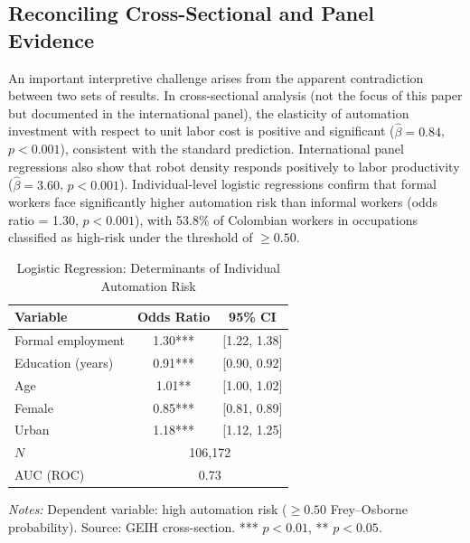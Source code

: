 \documentclass[5p,times,authoryear]{elsarticle}
\begin{document}
\subsection{Reconciling Cross-Sectional and Panel Evidence}
\label{subsec:reconciling}

An important interpretive challenge arises from the apparent contradiction between two sets of results. In cross-sectional analysis (not the focus of this paper but documented in the international panel), the elasticity of automation investment with respect to unit labor cost is positive and significant ($\hat{\beta} = 0.84$, $p < 0.001$), consistent with the standard prediction. International panel regressions also show that robot density responds positively to labor productivity ($\hat{\beta} = 3.60$, $p < 0.001$). Individual-level logistic regressions confirm that formal workers face significantly higher automation risk than informal workers (odds ratio = 1.30, $p < 0.001$), with 53.8\% of Colombian workers in occupations classified as high-risk under the \citet{frey2017future} threshold of $\geq 0.50$.

\begin{table}[htbp]
\centering
\begin{threeparttable}
\caption{Logistic Regression: Determinants of Individual Automation Risk}
\label{tab:logistic}
\small
\setlength{\tabcolsep}{4pt}
\begin{tabular}{@{}lcc@{}}
\toprule
Variable & Odds Ratio & 95\% CI \\
\midrule
Formal employment & 1.30*** & [1.22, 1.38] \\
Education (years) & 0.91*** & [0.90, 0.92] \\
Age & 1.01** & [1.00, 1.02] \\
Female & 0.85*** & [0.81, 0.89] \\
Urban & 1.18*** & [1.12, 1.25] \\
\midrule
$N$ & \multicolumn{2}{c}{106,172} \\
AUC (ROC) & \multicolumn{2}{c}{0.73} \\
\bottomrule
\end{tabular}
\begin{tablenotes}
\footnotesize
\item \textit{Notes:} Dependent variable: high automation risk ($\geq 0.50$ Frey--Osborne probability). Source: GEIH cross-section. *** $p<0.01$, ** $p<0.05$.
\end{tablenotes}
\end{threeparttable}
\end{table}
\end{document}
